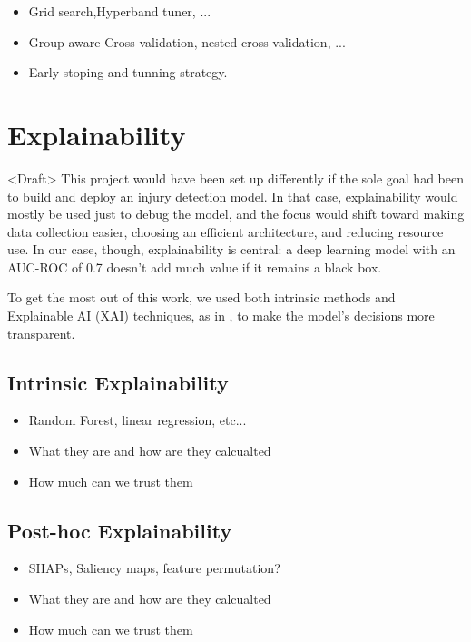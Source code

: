 \begin{itemize}
    \item Grid search,Hyperband tuner, ...
    \item Group aware Cross-validation, nested cross-validation, ...
    \item Early stoping and tunning strategy.
\end{itemize}




\section{Explainability}\label{sec:method-explainability}
<Draft> This project would have been set up differently if the sole goal had been to build and deploy an injury detection model. In that case, explainability would mostly be used just to debug the model, and the focus would shift toward making data collection easier, choosing an efficient architecture, and reducing resource use. In our case, though, explainability is central: a deep learning model with an AUC-ROC of 0.7 doesn't add much value if it remains a black box.

To get the most out of this work, we used both intrinsic methods and Explainable AI (XAI) techniques, as in \cite{FuentesJimnez2025}, to make the model's decisions more transparent.

\subsection{Intrinsic Explainability}\label{subsec:method-intrinsic-explainability}
\begin{itemize}
    \item Random Forest, linear regression, etc...
    \item What they are and how are they calcualted
    \item How much can we trust them
\end{itemize}

\subsection{Post-hoc Explainability}\label{subsec:method-posthoc-explainability}
\begin{itemize}
    \item SHAPs, Saliency maps, feature permutation?
    \item What they are and how are they calcualted
    \item How much can we trust them
\end{itemize}

